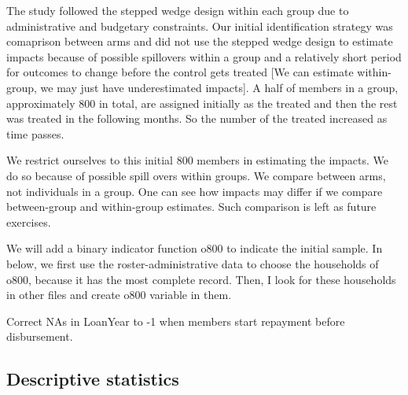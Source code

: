 The study followed the stepped wedge design within each group due to administrative and budgetary constraints. Our initial identification strategy was comaprison between arms and did not use the stepped wedge design to estimate impacts because of possible spillovers within a group and a relatively short period for outcomes to change before the control gets treated [We can estimate within-group, we may just have underestimated impacts]. A half of members in a group, approximately 800 in total, are assigned initially as the treated and then the rest was treated in the following months. So the number of the treated increased as time passes. 

We restrict ourselves to this initial 800 members in estimating the impacts. We do so because of possible spill overs within groups. We compare between arms, not individuals in a group. One can see how impacts may differ if we compare between-group and within-group estimates. Such comparison is left as future exercises.




We will add a binary indicator function \textsf{o800} to indicate the initial sample. In below, we first use the roster-administrative data to choose the households of \textsf{o800}, because it has the most complete record. Then, I look for these households in other files and create \textsf{o800} variable in them.

Correct NAs in \textsf{LoanYear} to -1 when members start repayment before disbursement.




\subsection{Descriptive statistics}


